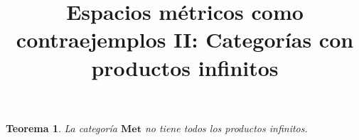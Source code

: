 \documentclass[draft,letter,10pt,notitlepage]{amsart}
\title{Espacios métricos como contraejemplos II: Categorías con productos infinitos}
\date{}
\newtheorem{theorem}{Teorema}
\theoremstyle{definition}
\theoremstyle{remark}
\begin{document}
\maketitle


\begin{theorem}
  La categoría \( \mathbf{Met}\) no tiene todos los productos infinitos.
\end{theorem}
\end{document}
